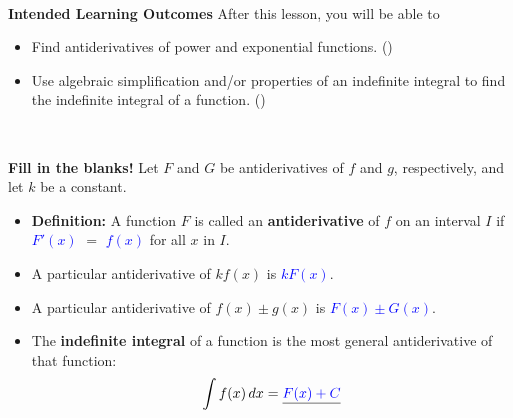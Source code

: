 \documentclass[10pt]{article}
\begin{document}
\hrulefill\\

\vspace{-0.6cm}

\textbf{Intended Learning Outcomes}
After this lesson, you will be able to 

\begin{itemize}
    \item Find antiderivatives of power and exponential functions. ()
    \item Use algebraic simplification and/or properties of an indefinite integral to find the indefinite integral of a function. ()

\end{itemize}

\vspace{-0.6cm}

\hrulefill\\

\begin{center}
\end{center}

{\bf\color{blue} Fill in the blanks!} Let $F$ and $G$ be antiderivatives of $f$ and $g$, respectively, and let $k$ be a constant.

\begin{itemize}
\item {\bf Definition:} A function $F$ is called an {\bf antiderivative} of $f$ on an interval $I$ if \underline{\textcolor{blue}{$F'(x)$}} $=$ \underline{\textcolor{blue}{$f(x)$}} for all $x$ in $I$.
\item A particular antiderivative of $kf(x)$ is \underline{\textcolor{blue}{$kF(x)$}}.
\item A particular antiderivative of $f(x)\pm g(x)$ is \underline{\textcolor{blue}{$F(x)\pm G(x)$}}.
\item The {\bf indefinite integral} of a function is the most general antiderivative of that function: 
\[\displaystyle\int f(x)\,dx = \underline{\textcolor{blue}{F(x)+C}}\]
\end{itemize}
\

\hrulefill

\

\begin{center}
\end{center}
\end{document}
